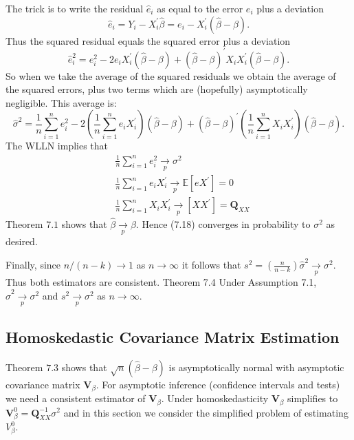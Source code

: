\documentclass[10pt]{article}
\begin{document}
The trick is to write the residual $\widehat{e}_{i}$ as equal to the error $e_{i}$ plus a deviation
$$
\widehat{e}_{i}=Y_{i}-X_{i}^{\prime} \widehat{\beta}=e_{i}-X_{i}^{\prime}(\widehat{\beta}-\beta) .
$$
Thus the squared residual equals the squared error plus a deviation
$$
\widehat{e}_{i}^{2}=e_{i}^{2}-2 e_{i} X_{i}^{\prime}(\widehat{\beta}-\beta)+(\widehat{\beta}-\beta)^{\prime} X_{i} X_{i}^{\prime}(\widehat{\beta}-\beta) .
$$
So when we take the average of the squared residuals we obtain the average of the squared errors, plus two terms which are (hopefully) asymptotically negligible. This average is:
$$
\widehat{\sigma}^{2}=\frac{1}{n} \sum_{i=1}^{n} e_{i}^{2}-2\left(\frac{1}{n} \sum_{i=1}^{n} e_{i} X_{i}^{\prime}\right)(\widehat{\beta}-\beta)+(\widehat{\beta}-\beta)^{\prime}\left(\frac{1}{n} \sum_{i=1}^{n} X_{i} X_{i}^{\prime}\right)(\widehat{\beta}-\beta) .
$$
The WLLN implies that
$$
\begin{aligned}
&\frac{1}{n} \sum_{i=1}^{n} e_{i}^{2} \underset{p}{\longrightarrow} \sigma^{2} \\
&\frac{1}{n} \sum_{i=1}^{n} e_{i} X_{i}^{\prime} \underset{p}{\longrightarrow} \mathbb{E}\left[e X^{\prime}\right]=0 \\
&\frac{1}{n} \sum_{i=1}^{n} X_{i} X_{i}^{\prime} \underset{p}{\longrightarrow}\left[X X^{\prime}\right]=\boldsymbol{Q}_{X X}
\end{aligned}
$$
Theorem $7.1$ shows that $\widehat{\beta} \underset{p}{\rightarrow} \beta$. Hence (7.18) converges in probability to $\sigma^{2}$ as desired.

Finally, since $n /(n-k) \rightarrow 1$ as $n \rightarrow \infty$ it follows that $s^{2}=\left(\frac{n}{n-k}\right) \widehat{\sigma}^{2} \underset{p}{\rightarrow} \sigma^{2}$. Thus both estimators are consistent. Theorem 7.4 Under Assumption 7.1, $\widehat{\sigma}^{2} \underset{p}{\longrightarrow} \sigma^{2}$ and $s^{2} \underset{p}{\rightarrow} \sigma^{2}$ as $n \rightarrow \infty$.

\subsection{Homoskedastic Covariance Matrix Estimation}
Theorem $7.3$ shows that $\sqrt{n}(\widehat{\beta}-\beta)$ is asymptotically normal with asymptotic covariance matrix $\boldsymbol{V}_{\beta}$. For asymptotic inference (confidence intervals and tests) we need a consistent estimator of $\boldsymbol{V}_{\beta}$. Under homoskedasticity $\boldsymbol{V}_{\beta}$ simplifies to $\boldsymbol{V}_{\beta}^{0}=\boldsymbol{Q}_{X X}^{-1} \sigma^{2}$ and in this section we consider the simplified problem of estimating $V_{\beta}^{0}$.
\end{document}
